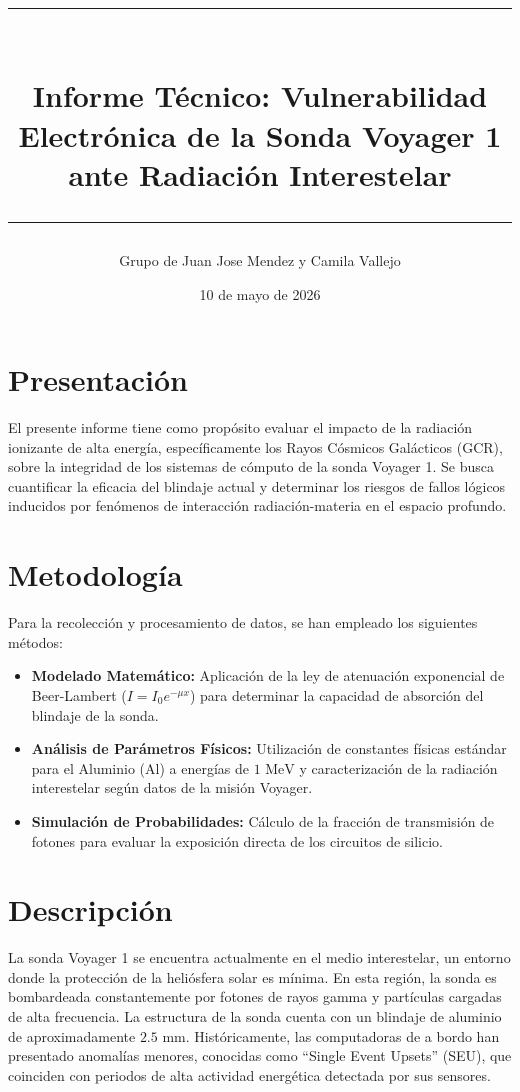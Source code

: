 \documentclass[12pt,a4paper]{article}
\title{
    \vspace{-2cm}
    \rule{\linewidth}{0.5mm} \\
    \vspace{0.4cm}
    \textbf{Informe Técnico: Vulnerabilidad Electrónica de la Sonda Voyager 1 ante Radiación Interestelar} \\
    \rule{\linewidth}{0.5mm}
}
\author{Grupo de Juan Jose Mendez y Camila Vallejo}
\date{10 de mayo de 2026}
\begin{document}
\maketitle

\section{Presentación}
El presente informe tiene como propósito evaluar el impacto de la radiación ionizante de alta energía, específicamente los Rayos Cósmicos Galácticos (GCR), sobre la integridad de los sistemas de cómputo de la sonda Voyager 1. Se busca cuantificar la eficacia del blindaje actual y determinar los riesgos de fallos lógicos inducidos por fenómenos de interacción radiación-materia en el espacio profundo.

\section{Metodología}
Para la recolección y procesamiento de datos, se han empleado los siguientes métodos:
\begin{itemize}
    \item \textbf{Modelado Matemático:} Aplicación de la ley de atenuación exponencial de Beer-Lambert ($I = I_0 e^{-\mu x}$) para determinar la capacidad de absorción del blindaje de la sonda.
    \item \textbf{Análisis de Parámetros Físicos:} Utilización de constantes físicas estándar para el Aluminio (Al) a energías de $1 \text{ MeV}$ y caracterización de la radiación interestelar según datos de la misión Voyager.
    \item \textbf{Simulación de Probabilidades:} Cálculo de la fracción de transmisión de fotones para evaluar la exposición directa de los circuitos de silicio.
\end{itemize}

\section{Descripción}
La sonda Voyager 1 se encuentra actualmente en el medio interestelar, un entorno donde la protección de la heliósfera solar es mínima. En esta región, la sonda es bombardeada constantemente por fotones de rayos gamma y partículas cargadas de alta frecuencia. La estructura de la sonda cuenta con un blindaje de aluminio de aproximadamente $2.5 \text{ mm}$. Históricamente, las computadoras de a bordo han presentado anomalías menores, conocidas como ``Single Event Upsets'' (SEU), que coinciden con periodos de alta actividad energética detectada por sus sensores.
\end{document}

